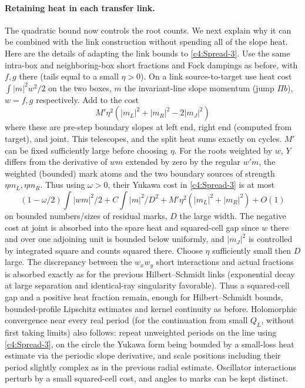\paragraph{Retaining heat in each transfer link.}
The quadratic bound now controls the root counts.  We next explain why
it can be combined with the link construction without spending all of
the slope heat.  Here are the details of adapting the link bounds to \eqref{c4:Spread-3}. Use the same intra-box and neighboring-box short fractions and Fock dampings as before, with \(f,g\) there (tails equal to a small \(\eta>0\)). On a link source-to-target use heat cost \(\int |m|^2 w^2/2\) on the two boxes, \(m\) the invariant-line slope momentum (jump \(\Pi b\)), \(w=f,g\) respectively. Add to the cost
\[
 M'\eta^2\left(|m_L|^2+|m_R|^2-2|m_J|^2\right)
\]
where these are pre-step boundary slopes at left end, right end (computed from target), and joint. This telescopes, and the split heat sums exactly on cycles. \(M'\) can be fixed sufficiently large before choosing \(\eta\). For the roots weighted by \(w\), \(Y\) differs from the derivative of \(w m\) extended by zero by the regular \(w'm\), the weighted (bounded) mark atoms and the two boundary sources of strength \(\eta m_L,\eta m_R\). Thus using \(\omega>0\), their Yukawa cost in \eqref{c4:Spread-3} is at most
\[
 (1-\omega/2)\int |w m|^2/2 + C\int |m|^2/D^2
       + M'\eta^2(|m_L|^2+|m_R|^2)+O(1)
\]
on bounded numbers/sizes of residual marks, \(D\) the large width. The negative cost at joint is absorbed into the spare heat and squared-cell gap since \(w\) there and over one adjoining unit is bounded below uniformly, and \(|m_J|^2\) is controlled by integrated square and counts squared there. Choose \(\eta\) sufficiently small then \(D\) large. The discrepancy between the \(w_xw_y\) short interactions and actual fractions is absorbed exactly as for the previous Hilbert--Schmidt links (exponential decay at large separation and identical-ray singularity favorable). Thus a squared-cell gap and a positive heat fraction remain, enough for Hilbert--Schmidt bounds, bounded-profile Lipschitz estimates and kernel continuity as before. Holomorphic convergence near every real period (for the continuation from small \(Q_L\), without first taking limits) also follows: repeat unweighted periods on the line using \eqref{c4:Spread-3}, on the circle the Yukawa form being bounded by a small-loss heat estimate via the periodic slope derivative, and scale positions including their period slightly complex as in the previous radial estimate. Oscillator interactions perturb by a small squared-cell cost, and angles to marks can be kept distinct.

